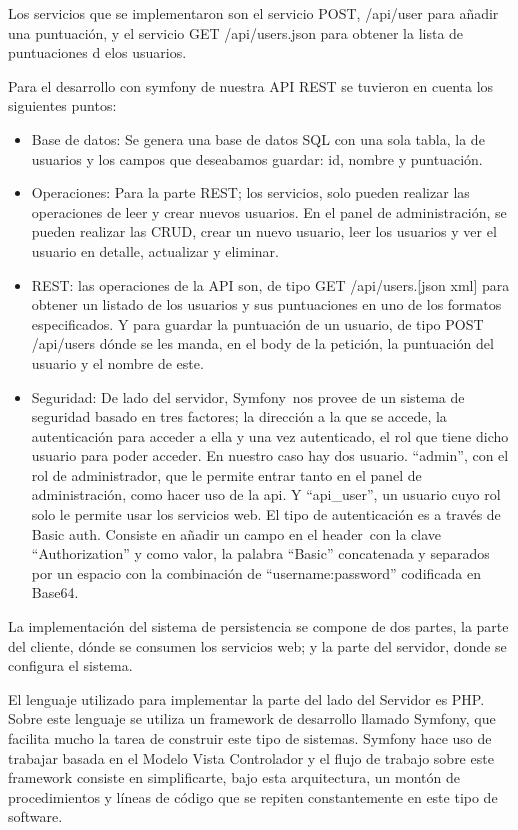 Los servicios que se implementaron son el servicio POST, /api/user para añadir una puntuación, y el servicio GET /api/users.json para obtener la lista de puntuaciones d elos usuarios.

Para el desarrollo con symfony de nuestra API REST se tuvieron en cuenta los siguientes puntos:

\begin{itemize}
\item{Base de datos: Se genera una base de datos SQL con una sola tabla, la de usuarios y los campos que deseabamos guardar: id, nombre y puntuación.}

\item{Operaciones: Para la parte REST; los servicios, solo pueden realizar las operaciones de leer y crear nuevos usuarios. En el panel de administración, se pueden realizar las CRUD, crear un nuevo usuario, leer los usuarios y ver el usuario en detalle, actualizar y eliminar.}

\item{REST: las operaciones de la API son, de tipo GET /api/users.{[}json \textbar{} xml{]} para obtener un listado de los usuarios y sus puntuaciones en uno de los formatos especificados. Y para guardar la puntuación de un usuario, de tipo POST /api/users dónde se les manda, en el body de la petición, la puntuación del usuario y el nombre de este.}

\item{Seguridad: De lado del servidor, Symfony~nos provee de un sistema de seguridad basado en tres factores; la dirección a la que se accede, la autenticación para acceder a ella y una vez autenticado, el rol que tiene dicho usuario para poder acceder. En nuestro caso hay dos usuario. ``admin'', con el rol de administrador, que le permite entrar tanto en el panel de administración, como hacer uso de la api. Y ``api\_user'', un usuario cuyo rol solo le permite usar los servicios web. El tipo de autenticación es a través de Basic auth. Consiste en añadir un campo en el header~con la clave ``Authorization'' y como valor, la palabra ``Basic'' concatenada y separados por un espacio con la combinación de ``username:password'' codificada en Base64.}
\end{itemize}

La implementación del sistema de persistencia se compone de dos partes, la parte del cliente, dónde se consumen los servicios web; y la parte del servidor, donde se configura el sistema.

El lenguaje utilizado para implementar la parte del lado del Servidor es PHP. Sobre este lenguaje se utiliza un framework de desarrollo llamado Symfony, que facilita mucho la tarea de construir este tipo de sistemas. Symfony hace uso de trabajar basada en el Modelo Vista Controlador y el flujo de trabajo sobre este framework consiste en simplificarte, bajo esta arquitectura, un montón de procedimientos y líneas de código que se repiten constantemente en este tipo de software.

